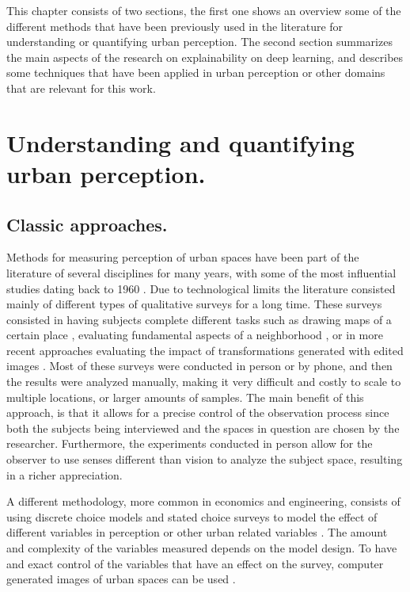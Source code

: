 This chapter consists of two sections, the first one shows an overview some of the
different methods that have been previously used in the literature
for understanding or quantifying urban perception.
The second section summarizes the main aspects of the research
on explainability on deep learning, and describes some techniques that have been applied
in urban perception or other domains that are relevant for this work.


\section{Understanding and quantifying urban perception.}

\subsection{Classic approaches.}
Methods for measuring perception of urban spaces have been part of the literature of several
disciplines for many years,  with some of the most influential studies dating back to 1960
\cite{lynch}. Due to technological limits the literature consisted mainly of different types of
qualitative surveys for a long time. These surveys consisted in having subjects complete
different tasks such as drawing maps of a certain place \cite{lynch}, evaluating fundamental
aspects of a neighborhood \cite{nasar_perception}, or in more recent approaches evaluating
the impact of transformations generated with edited images \cite{jiang_minimizing}. Most of
these surveys were conducted in person or by phone, and then the results were analyzed manually,
making it very difficult and costly to scale to multiple locations, or larger amounts of samples.
The main benefit of this approach, is that it allows for a precise control of the observation process
since both the subjects being interviewed and the spaces in question are chosen by the researcher.
Furthermore, the experiments conducted in person allow for the observer to use senses different
than vision to analyze the subject space, resulting in a richer appreciation.

A different methodology, more common in economics and engineering, consists of using discrete choice models
and stated choice surveys to model the effect of different variables in perception or other urban
related variables  \cite{rose_sc, iglesias_perception, torres_housing}. The amount and complexity of the
variables measured depends on the model design. To have and exact control of the variables that
have an effect on the survey, computer generated images of urban spaces can be used
\cite{iglesias_perception,torres_housing}.

